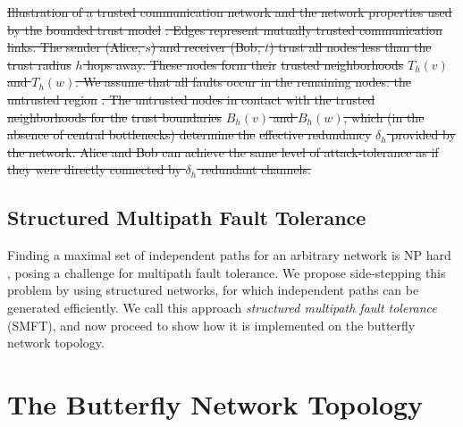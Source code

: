 \documentclass[10pt,letterpaper]{article}
\providecommand{\DIFdeltex}[1]{{\protect\color{red}\sout{#1}}}                      %
\providecommand{\DIFdelbegin}{} %
\providecommand{\DIFdelend}{} %
\providecommand{\DIFdelFL}[1]{\DIFdel{#1}} %
\providecommand{\DIFdel}[1]{\texorpdfstring{\DIFdeltex{#1}}{}} %
\begin{document}
\DIFdelbegin %
{%
\DIFdelFL{Illustration of a trusted communication network and the network properties
used by the }%
\DIFdelFL{bounded trust model}%
\DIFdelFL{.
Edges represent mutually trusted communication links.
The sender (Alice, $s$) and receiver (Bob, $t$) trust all nodes
less than the }%
\DIFdelFL{trust radius}%
\DIFdelFL{$h$ hops away.
These nodes form their }%
\DIFdelFL{trusted neighborhoods}%
\DIFdelFL{$T_h(v)$ and $T_h(w)$.
We assume that all faults occur in the remaining nodes: the
}%
\DIFdelFL{untrusted region}%
\DIFdelFL{.
The untrusted nodes in contact with the trusted neighborhoods for the
}%
\DIFdelFL{trust boundaries}%
\DIFdelFL{$B_h(v)$ and $B_h(w)$,
which (in the absence of central bottlenecks) determine the
}%
\DIFdelFL{effective redundancy}%
\DIFdelFL{$\delta_h$ provided by the network.
Alice and Bob can achieve the same level of attack-tolerance
as if they were directly connected by $\delta_h$ redundant channels.
}}


\DIFdelend \subsection*{Structured Multipath Fault Tolerance}

Finding a maximal set of independent paths for an arbitrary network is NP hard
\cite{reiter_resilient_1998},
posing a challenge for multipath fault tolerance.
We propose side-stepping this problem by using structured networks,
for which independent paths can be generated efficiently.
We call this approach {\em structured multipath fault tolerance} (SMFT),
and now proceed to show how it is implemented on the butterfly
network topology.

\section*{The Butterfly Network Topology}
\label{sec-butterfly}
\end{document}

